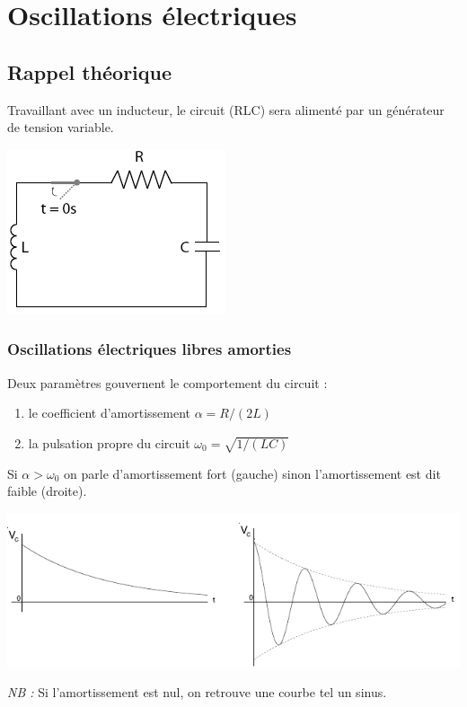 \documentclass	[11pt, a4paper, openany]{book}
\begin{document}
		
		\newpage
		\section{Oscillations électriques}
		\subsection{Rappel théorique}
		Travaillant avec un inducteur, le circuit (RLC) sera alimenté par un générateur de tension variable.
		\begin{center}
			\includegraphics[scale=0.1]{labo/image29.png}
		\end{center}
		\subsubsection*{Oscillations électriques libres amorties}
		Deux paramètres gouvernent le comportement du circuit : 
		\begin{enumerate}
			\item le coefficient d'amortissement $\alpha = R/(2L)$
			\item la pulsation propre du circuit $\omega_0 = \sqrt{1/(LC)}$
		\end{enumerate}
		Si $\alpha > \omega_0$ on parle d'amortissement fort (gauche) sinon l'amortissement est dit faible (droite).
		\begin{center}
			\includegraphics[scale=0.5]{labo/image30.png}
		\end{center}
		\textit{NB :} Si l'amortissement est nul, on retrouve une courbe tel un sinus.
		
\end{document}

